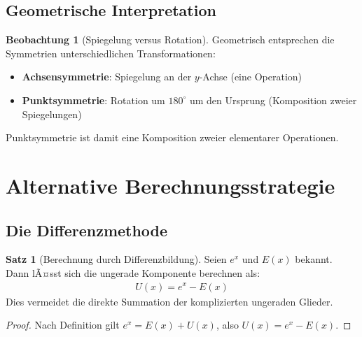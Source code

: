 ﻿\documentclass[a4paper,12pt]{article}
\theoremstyle{definition}
\newtheorem{satz}{Satz}
\newtheorem{beobachtung}{Beobachtung}
\begin{document}
\subsection{Geometrische Interpretation}

\begin{beobachtung}[Spiegelung versus Rotation]
Geometrisch entsprechen die Symmetrien unterschiedlichen Transformationen:
\begin{itemize}
  \item[-] \textbf{Achsensymmetrie}: Spiegelung an der $y$-Achse
           (eine Operation)
  \item[-] \textbf{Punktsymmetrie}: Rotation um $180^\circ$ um den Ursprung
           (Komposition zweier Spiegelungen)
\end{itemize}
Punktsymmetrie ist damit eine Komposition zweier elementarer Operationen.
\end{beobachtung}

\section{Alternative Berechnungsstrategie}

\subsection{Die Differenzmethode}

\begin{satz}[Berechnung durch Differenzbildung]
Seien $e^x$ und $E(x)$ bekannt. Dann lÃ¤sst sich die ungerade Komponente
berechnen als:
\begin{align}
  U(x) = e^x - E(x)
\end{align}
Dies vermeidet die direkte Summation der komplizierten ungeraden Glieder.
\end{satz}

\begin{proof}
Nach Definition gilt $e^x = E(x) + U(x)$, also $U(x) = e^x - E(x)$.
\end{proof}
\end{document}

